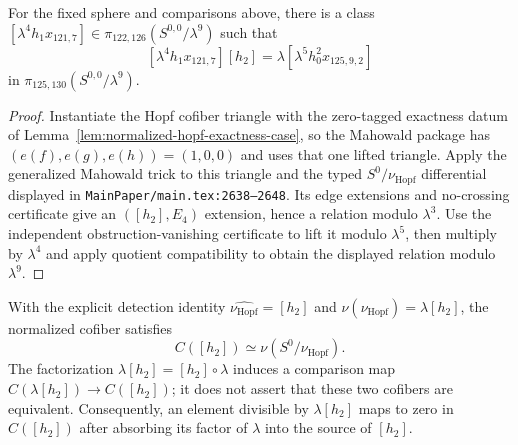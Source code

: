 \begin{lemma}
  \label{lem:near126-nu-extension}
  \notready
  For the fixed sphere and comparisons above, there is a class
  $[\lambda^4h_1x_{121,7}]\in
  \pi_{122,126}(S^{0,0}/\lambda^9)$ such that
  \[
    [\lambda^4h_1x_{121,7}][h_2]
       =\lambda[\lambda^5h_0^2x_{125,9,2}]
  \]
  in $\pi_{125,130}(S^{0,0}/\lambda^9)$.
\end{lemma}

\begin{proof}
  Instantiate the Hopf cofiber triangle with the zero-tagged exactness datum
  of Lemma~\ref{lem:normalized-hopf-exactness-case}, so the Mahowald package
  has $(e(f),e(g),e(h))=(1,0,0)$ and uses that one lifted triangle.  Apply the
  generalized Mahowald trick to this triangle and the
  typed $S^0/\nu_{\mathrm{Hopf}}$ differential
  displayed in \texttt{MainPaper/main.tex:2638--2648}.  Its edge extensions and
  no-crossing certificate give an $([h_2],E_4)$ extension, hence a relation
  modulo $\lambda^3$.  Use the independent obstruction-vanishing certificate
  to lift it modulo $\lambda^5$, then multiply by $\lambda^4$ and apply quotient
  compatibility to obtain the displayed relation modulo $\lambda^9$.
\end{proof}

\begin{proposition}
  \label{prop:synthetic-hopf-cofiber-equivalence}
  \notready
  With the explicit detection identity
  $\widehat{\nu_{\mathrm{Hopf}}}=[h_2]$ and
  $\nu(\nu_{\mathrm{Hopf}})=\lambda[h_2]$, the normalized cofiber satisfies
  \[
    C([h_2])\simeq\nu(S^0/\nu_{\mathrm{Hopf}}).
  \]
  The factorization $\lambda[h_2]=[h_2]\circ\lambda$ induces a comparison map
  $C(\lambda[h_2])\to C([h_2])$; it does not assert that these two cofibers are
  equivalent.  Consequently, an element divisible by $\lambda[h_2]$ maps to
  zero in $C([h_2])$ after absorbing its factor of $\lambda$ into the source of
  $[h_2]$.
\end{proposition}

